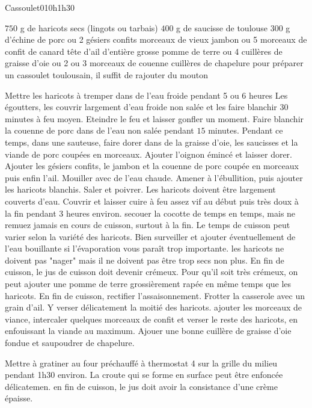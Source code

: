 \begin{recette}{Cassoulet}{0}{10h}{1h30}
\begin{ingredients}[7 pers.]
\ingredient $750$ g de haricots secs (lingots ou tarbais)
\ingredient $400$ g de saucisse de toulouse
\ingredient $300$ g d'échine de porc
 ou 2 gésiers confits
 morceaux de vieux jambon
 ou 5 morceaux de confit de canard
 tête d'ail d'entière
 grosse pomme de terre
 ou 4 cuillères de graisse d'oie ou 2 ou 3 morceaux de couenne
 cuillères de chapelure
\ingredient pour préparer un cassoulet toulousain, il suffit de rajouter du mouton
\end{ingredients}

\begin{preparation}
\etape Mettre les haricots à tremper dans de l'eau froide pendant 5 ou 6 heures
\etape Les égoutters, les couvrir largement d'eau froide non salée et les faire blanchir $30$ minutes à feu moyen. Eteindre le feu et laisser gonfler un moment.
\etape Faire blanchir la couenne de porc dans de l'eau non salée pendant $15$ minutes.
\etape Pendant ce temps, dans une sauteuse, faire dorer dans de la graisse d'oie, les saucisses et la viande de porc coupées en morceaux. Ajouter l'oignon émincé et laisser dorer.
\etape Ajouter les gésiers confits, le jambon et la couenne de porc coupée en morceaux puis enfin l'ail.
\etape Mouiller avec de l'eau chaude. Amener à l'ébullition, puis ajouter les haricots blanchis. Saler et poivrer. Les haricots doivent être largement couverts d'eau. Couvrir et laisser cuire à feu assez vif au début puis très doux à la fin pendant 3 heures environ. secouer la cocotte de temps en temps, mais ne remuez jamais en cours de cuisson, surtout à la fin. Le temps de cuisson peut varier selon la variété des haricots. Bien surveiller et ajouter éventuellement de l'eau bouillante si l'évaporation vous paraît trop importante. les haricots ne doivent pas "nager" mais il ne doivent pas être trop secs non plus. En fin de cuisson, le jus de cuisson doit devenir crémeux. Pour qu'il soit très crémeux, on peut ajouter une pomme de terre grossièrement rapée en même temps que les haricots. En fin de cuisson, rectifier l'assaisonnement.
\etape Frotter la casserole avec un grain d'ail. Y verser délicatement la moitié des haricots. ajouter les morceaux de viance, intercaler quelques morceaux de confit et verser le reste des haricots, en enfouissant la viande au maximum. Ajouer une bonne cuillère de graisse d'oie fondue et saupoudrer de chapelure.
\end{preparation}

\begin{cuisson}
Mettre à gratiner au four préchauffé à thermostat 4 sur la grille du milieu pendant 1h30 environ. La croute qui se forme en surface peut être enfoncée délicatemen. en fin de cuisson, le jus doit avoir la consistance d'une crème épaisse.
\end{cuisson}
\end{recette}

